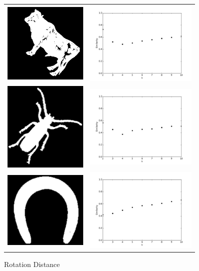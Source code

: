 \documentclass[a4paper, 11pt]{article}
\begin{document}
\begin{figure}[p]
\begin{tabular}{ll}
\includegraphics[width=4cm]{cattle.png} &
\includegraphics[height=4cm]{cattle-rotation.pdf} \\
\includegraphics[width=4cm]{beetle.png} &
\includegraphics[height=4cm]{beetle-rotation.pdf} \\
\includegraphics[width=4cm]{horseshoe.png} &
\includegraphics[height=4cm]{horseshoe-rotation.pdf} \\
\end{tabular}
\caption{Rotation Distance}
\label{figure:rotation}
\end{figure}
\end{document}
